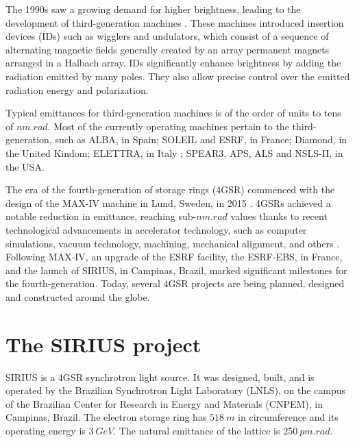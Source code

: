 The 1990s saw a growing demand for higher brightness, leading to the development of third-generation machines \cite{liu_towards_2017}. These machines introduced insertion devices (IDs) such as wigglers and undulators, which consist of a sequence of alternating magnetic fields generally created by an array permanent magnets arranged in a Halbach array. IDs significantly enhance brightness by adding the radiation emitted by many poles. They also allow precise control over the emitted radiation energy and polarization.

Typical emittances for third-generation machines is of the order of units to tens of $\unit{nm}.\unit{rad}$. Most of the currently operating machines pertain to the third-generation, such as ALBA, in Spain; SOLEIL and ESRF, in France; Diamond, in the United Kindom; ELETTRA, in Italy \cite{simoulin_synchrotron_2016}; SPEAR3, APS, ALS and NSLS-II, in the USA.

The era of the fourth-generation of storage rings (4GSR) commenced with the design of the MAX-IV machine in Lund, Sweden, in 2015 \cite{liu_towards_2017,hettel_challenges_2014}. 4GSRs achieved a notable reduction in emittance, reaching sub-$\unit{nm}.\unit{rad}$ values thanks to recent technological advancements in accelerator technology, such as computer simulations, vacuum technology, machining, mechanical alignment, and others  \cite{hettel_challenges_2014,liu_towards_2017}. Following MAX-IV, an upgrade of the ESRF facility, the ESRF-EBS, in France, and the launch of SIRIUS, in Campinas, Brazil, marked significant milestones for the fourth-generation. Today, several 4GSR projects are being planned, designed and constructed around the globe.

\section*{The SIRIUS project}

SIRIUS is a 4GSR synchrotron light source. It was designed, built, and is operated by the Brazilian Synchrotron Light Laboratory (LNLS), on the campus of the Brazilian Center for Research in Energy and Materials (CNPEM), in Campinas, Brazil. The electron storage ring has $518~\unit{m}$ in circumference and its operating energy is $3~\unit{GeV}$. The natural emittance of the lattice is $250~\unit{pm}.\unit{rad}$. 


